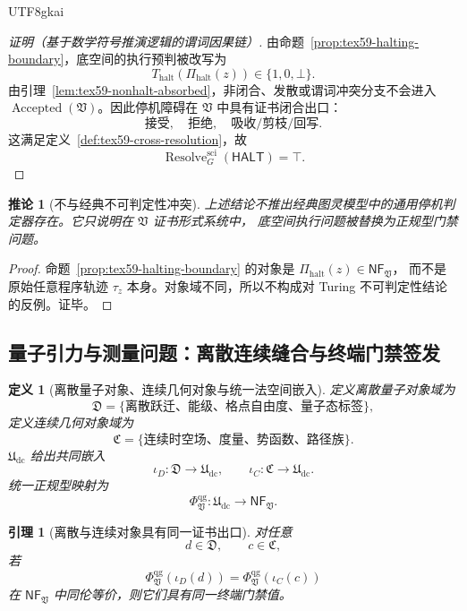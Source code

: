 \documentclass[12pt]{article}
\newtheorem{definition}{定义}[section]
\newtheorem{corollary}{推论}[section]
\newtheorem{lemma}{引理}[section]
\newcommand{\Udc}{\mathfrak{U}_{\mathrm{dc}}}
\newcommand{\Vsys}{\mathfrak V}
\newcommand{\NF}{\mathsf{NF}}
\DeclareMathOperator{\Accepted}{Accepted}
\DeclareMathOperator{\Resolve}{Resolve}
\begin{document}
\begin{CJK*}{UTF8}{gkai}
\begin{proof}[证明（基于数学符号推演逻辑的谓词因果链）]
由命题~\ref{prop:tex59-halting-boundary}，底空间的执行预判被改写为
\[
  T_{\mathrm{halt}}(\Pi_{\mathrm{halt}}(z))\in\{1,0,\bot\}.
\]
由引理~\ref{lem:tex59-nonhalt-absorbed}，非闭合、发散或谓词冲突分支不会进入
\(\Accepted(\Vsys)\)。因此停机障碍在 \(\Vsys\) 中具有证书闭合出口：
\[
  \text{接受},\quad \text{拒绝},\quad \text{吸收/剪枝/回写}.
\]
这满足定义~\ref{def:tex59-cross-resolution}，故
\[
  \Resolve_G^{\mathrm{sci}}(\mathsf{HALT})=\top.
\]
\end{proof}

\begin{corollary}[不与经典不可判定性冲突]
\label{cor:tex59-halting-no-conflict}
上述结论不推出经典图灵模型中的通用停机判定器存在。它只说明在 \(\Vsys\) 证书形式系统中，
底空间执行问题被替换为正规型门禁问题。
\end{corollary}

\begin{proof}
命题~\ref{prop:tex59-halting-boundary} 的对象是 \(\Pi_{\mathrm{halt}}(z)\in\NF_{\Vsys}\)，
而不是原始任意程序轨迹 \(\tau_z\) 本身。对象域不同，所以不构成对 Turing 不可判定性结论
\cite{Turing1936Computable} 的反例。证毕。
\end{proof}

\subsection{量子引力与测量问题：离散连续缝合与终端门禁签发}
\label{subsec:tex59-qg-measure}

\begin{definition}[离散量子对象、连续几何对象与统一法空间嵌入]
\label{def:tex59-qg-udc}
定义离散量子对象域为
\[
  \mathfrak D
  =
  \{\text{离散跃迁、能级、格点自由度、量子态标签}\},
\]
定义连续几何对象域为
\[
  \mathfrak C
  =
  \{\text{连续时空场、度量、势函数、路径族}\}.
\]
\(\Udc\) 给出共同嵌入
\[
  \iota_D:\mathfrak D\to\Udc,
  \qquad
  \iota_C:\mathfrak C\to\Udc.
\]
统一正规型映射为
\[
  \Phi_{\Vsys}^{\mathrm{qg}}:
  \Udc\longrightarrow\NF_{\Vsys}.
\]
\end{definition}

\begin{lemma}[离散与连续对象具有同一证书出口]
\label{lem:tex59-qg-common-gate}
对任意
\[
  d\in\mathfrak D,\qquad c\in\mathfrak C,
\]
若
\[
  \Phi_{\Vsys}^{\mathrm{qg}}(\iota_D(d))
  =
  \Phi_{\Vsys}^{\mathrm{qg}}(\iota_C(c))
\]
在 \(\NF_{\Vsys}\) 中同伦等价，则它们具有同一终端门禁值。
\end{lemma}


\end{CJK*}
\end{document}
